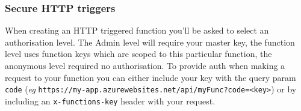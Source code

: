 \documentclass{article}
\newcommand{\code}{\texttt}
\begin{document}
\subsubsection{Secure HTTP triggers}
When creating an HTTP triggered function you'll be asked to select an authorisation level. The Admin level will require your master key, the function level uses function keys which are scoped to this particular function, the anonymous level required no authorisation. To provide auth when making a request to your function you can either include your key with the query param \code{code} (\textit{eg} \code{https://my-app.azurewebsites.net/api/myFunc?code=<key>}) or by including an \code{x-functions-key} header with your request.   

%
%
\end{document}
